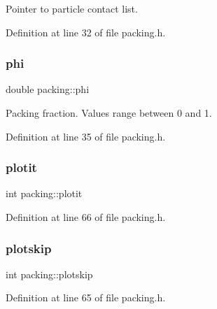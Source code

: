Pointer to particle contact list. 



Definition at line 32 of file packing.\+h.

\mbox{\label{classpacking_a951a89b6ca12a40cb60344752bd8d817}} 
\subsubsection{\texorpdfstring{phi}{phi}}
{\footnotesize\ttfamily double packing\+::phi\hspace{0.3cm}{\ttfamily [protected]}}



Packing fraction. Values range between 0 and 1. 



Definition at line 35 of file packing.\+h.

\mbox{\label{classpacking_a495864a18a5eeef957d7a1bc3d3eb2bd}} 
\subsubsection{\texorpdfstring{plotit}{plotit}}
{\footnotesize\ttfamily int packing\+::plotit\hspace{0.3cm}{\ttfamily [protected]}}



Definition at line 66 of file packing.\+h.

\mbox{\label{classpacking_aa88ec1647a3bdcf9c3cc03ea03257c1b}} 
\subsubsection{\texorpdfstring{plotskip}{plotskip}}
{\footnotesize\ttfamily int packing\+::plotskip\hspace{0.3cm}{\ttfamily [protected]}}



Definition at line 65 of file packing.\+h.

\mbox{\label{classpacking_a3e301d8084ada7f0258b80639fa83c88}} 
